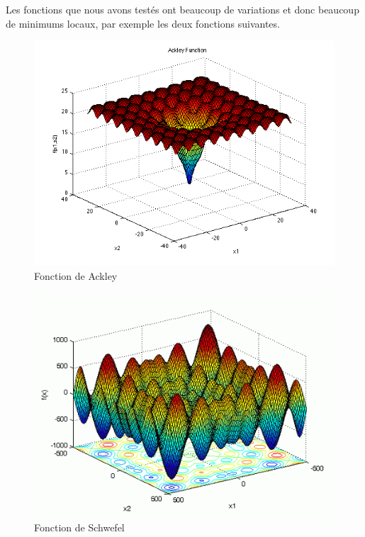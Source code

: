 \documentclass[12pt]{article}
\begin{document}
Les fonctions que nous avons testés ont beaucoup de variations et donc beaucoup de minimums locaux, par exemple les deux fonctions suivantes.
\begin{multicols}{2}
   \begin{figure}[H]
	\centering\includegraphics[scale=0.35]{ackley.png}
    \caption{Fonction de Ackley}
\end{figure}
   
   \begin{figure}[H]
	\centering\includegraphics[scale=0.35]{schwefel.png}
    \caption{Fonction de Schwefel}
\end{figure}
\end{multicols}
\end{document}
